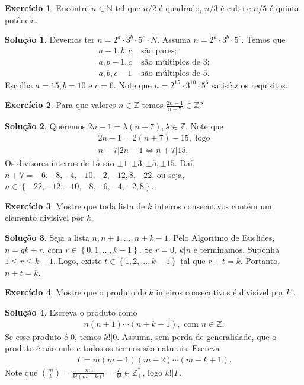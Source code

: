 \documentclass[a4paper,11pt,twoside, leqno]{article}
\theoremstyle{definition}
\newtheorem{exercise}{Exercício}
\newtheorem*{solution}{Solução}
\begin{document}
\begin{exercise}
	Encontre $n\in\mathbb{N}$ tal que $n/2$ é quadrado, $n/3$ é cubo e $n/5$ é quinta potência.
\end{exercise}
\begin{solution}
	Devemos ter $n = 2^a\cdot3^b\cdot5^c\cdot N$. Assuma $n = 2^a\cdot3^b\cdot5^c$. Temos que
	\begin{align*}
	a-1, b, c &\text{ são pares}; \\
	a, b-1, c &\text{ são múltiplos de 3}; \\
	a, b, c-1 &\text{ são múltiplos de 5}.
	\end{align*}
	Escolha $a=15, b=10$ e $c=6$. Note que $n = 2^{15}\cdot 3^{10}\cdot 5^6$ satisfaz os requisitos.
\end{solution}
\begin{exercise}
	Para que valores $n\in\mathbb{Z}$ temos $\displaystyle{ \frac{2n-1}{n+7}\in\mathbb{Z} }$?
\end{exercise}
\begin{solution}
	Queremos $2n-1 = \lambda(n+7), \lambda\in\mathbb{Z}$. Note que 
	\begin{align*}
	2n-1 = 2(n+7) - 15, \text{ logo} \\
	n+7|2n-1 \Leftrightarrow n+7|15.
	\end{align*}
	Os divisores inteiros de $15$ são $\pm1, \pm3, \pm5, \pm15$. Daí, $n+7 = -6,-8,-4,-10,-2,-12,8,-22$, ou seja, $n\in\left\{ -22,-12,-10, -8, -6, -4, -2, 8 \right\}$.
\end{solution}
\begin{exercise}
	Mostre que toda lista de $k$ inteiros consecutivos contém um elemento divisível por $k$.
\end{exercise}
\begin{solution}
	Seja a lista $n, n+1, \dots, n+k-1$. Pelo Algoritmo de Euclides, $n = qk+r$, com $r\in\left\{ 0,1,\dots,k-1 \right\}$. Se $r=0$, $k|n$ e terminamos. Suponha $1\leq r\leq k-1$. Logo, existe $t\in\left\{ 1,2,\dots,k-1 \right\}$ tal que $r+t = k$. Portanto, $n+t=k$.
\end{solution}
\begin{exercise}
	Mostre que o produto de $k$ inteiros consecutivos é divisível por $k!$.
\end{exercise}
\begin{solution}
	Escreva o produto como
	\begin{align*}
	n(n+1)\cdots(n+k-1), \text{ com }n\in\mathbb{Z}.
	\end{align*}
	Se esse produto é $0$, temos $k!|0$. Assuma, sem perda de generalidade, que o produto é não nulo e todos os termos são naturais. Escreva
	\begin{align*}
	\Gamma = m(m-1)(m-2)\cdots (m-k+1).
	\end{align*}
	Note que $\displaystyle{\binom{m}{k} = \frac{m!}{k!(m-k)!} = \frac{\Gamma}{k!}\in\mathbb{Z}_{+}^{\ast}}$, logo $k!|\Gamma$.
\end{solution}
\end{document}
